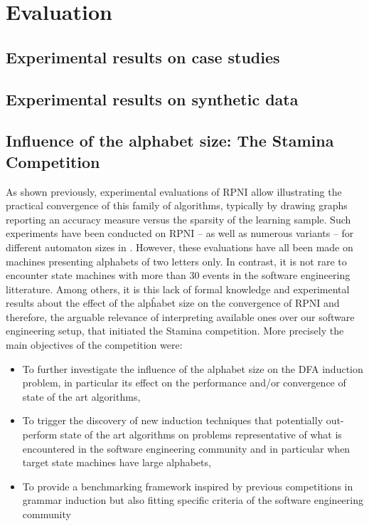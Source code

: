 \chapter{Evaluation}

\section{Experimental results on case studies}

\section{Experimental results on synthetic data}

\section{Influence of the alphabet size: The Stamina Competition\label{section_stamina}}

As shown previously, experimental evaluations of RPNI allow illustrating the practical convergence of this family of algorithms, typically by drawing graphs reporting an accuracy measure versus the sparsity of the learning sample. Such experiments have been conducted on RPNI -- as well as numerous variants -- for different automaton sizes in \cite{Lang98,Damas06,Dupont08,Lambeau08}. However, these evaluations have all been made on machines presenting alphabets of two letters only. In contrast, it is not rare to encounter state machines with more than 30 events in the software engineering litterature. Among others, it is this lack of formal knowledge and experimental results about the effect of the alpĥabet size on the convergence of RPNI and therefore, the arguable relevance of interpreting available ones over our software engineering setup, that initiated the Stamina competition. More precisely the main objectives of the competition were:

\begin{itemize}
\item To further investigate the influence of the alphabet size on the DFA induction problem, in particular its effect on the performance and/or convergence of state of the art algorithms,
\item To trigger the discovery of new induction techniques that potentially out-perform state of the art algorithms on problems representative of what is encountered in the software engineering community and in particular when target state machines have large alphabets,
\item To provide a benchmarking framework inspired by previous competitions in grammar induction but also fitting specific criteria of the software engineering community
\end{itemize}

